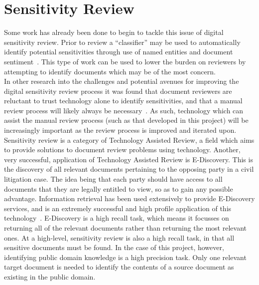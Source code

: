 \documentclass{l4proj}
\begin{document}
\section{Sensitivity Review}
Some work has already been done to begin to tackle this issue of digital sensitivity review. Prior to review a ``classifier'' may be used to automatically identify potential sensitivities through use of named entities and document sentiment~\cite{mcdonald2014towards}. This type of work can be used to lower the burden on reviewers by attempting to identify documents which may be of the most concern. \\
In other research into the challenges and potential avenues for improving the digital sensitivity review process it was found that document reviewers are reluctant to trust technology alone to identify sensitivities, and that a manual review process will likely always be necessary~\cite{gollins2014using}. 
As such, technology which can assist the manual review process (such as that developed in this project) will be increasingly important as the review process is improved and iterated upon.\\
Sensitivity review is a category of Technology Assisted Review, a field which aims to provide solutions to document review problems using technology. Another, very successful, application of Technology Assisted Review is E-Discovery. This is the discovery of all relevant documents pertaining to the opposing party in a civil litigation case. The idea being that each party should have access to all documents that they are legally entitled to view, so as to gain any possible advantage. Information retrieval has been used extensively to provide E-Discovery services, and is an extremely successful and high profile application of this technology~\cite{oard2013information}. E-Discovery is a high recall task, which means it focusses on returning all of the relevant documents rather than returning the most relevant ones. At a high-level, sensitivity review is also a high recall task, in that all sensitive documents must be found. In the case of this project, however, identifying public domain knowledge is a high precision task. Only one relevant target document is needed to identify the contents of a source document as existing in the public domain.
\end{document}
